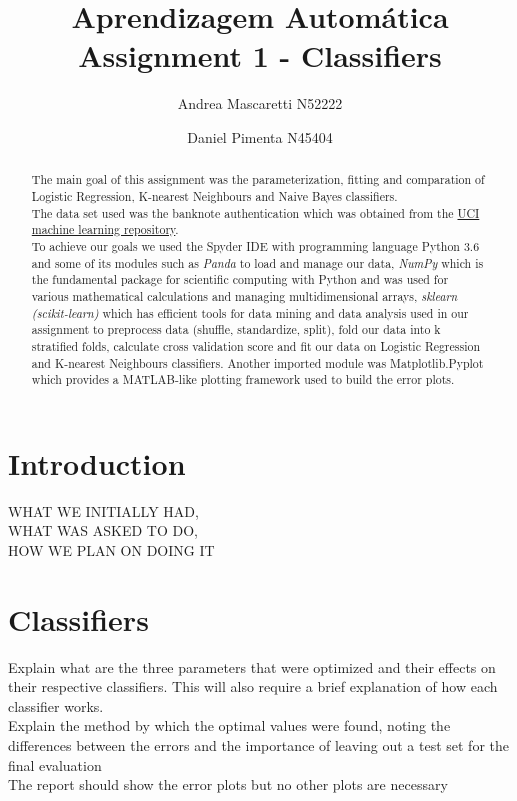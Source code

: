 \documentclass[a4paper]{article}
\title{\textbf{Aprendizagem Automática} \\
\large Assignment 1 - Classifiers}
\author{Andrea Mascaretti N52222\and Daniel Pimenta N45404}
\begin{document}
\maketitle

\begin{abstract}
The main goal of this assignment was the parameterization, fitting and comparation of Logistic Regression, K-nearest Neighbours and Naive Bayes classifiers.\\ 
The data set used was the banknote authentication which was obtained from the \hyperref['https://archive.ics.uci.edu/ml/datasets/banknote+authentication]{UCI machine learning repository}.\\
To achieve our goals we used the Spyder IDE with programming language Python 3.6 and some of its modules such as \textit{Panda} to load and manage our data, \textit{NumPy} which is the fundamental package for scientific computing with Python and was used for various mathematical calculations and managing multidimensional arrays, \textit{sklearn (scikit-learn)} which has efficient tools for data mining and data analysis used in our assignment to preprocess data (shuffle, standardize, split), fold our data into k stratified folds, calculate cross validation score and fit our data on Logistic Regression and K-nearest Neighbours classifiers. Another imported module was Matplotlib.Pyplot which provides a MATLAB-like plotting framework used to build the error plots. 
\end{abstract}

\section{Introduction}
WHAT WE INITIALLY HAD,\\
WHAT WAS ASKED TO DO,\\
HOW WE PLAN ON DOING IT\\

\section{Classifiers}

Explain what are the three parameters that were optimized and their effects on their respective classifiers. This will also require a brief explanation of how each classifier works.\\
Explain the method by which the optimal values were found, noting the differences between the errors and the importance of leaving out a test set for the final evaluation\\
The report should show the error plots but no other plots are necessary\\
\end{document}
